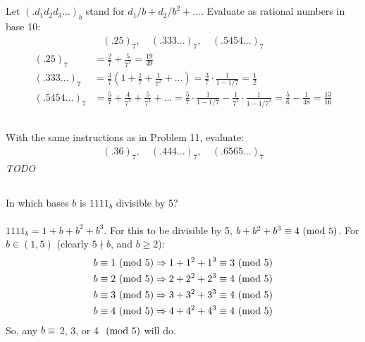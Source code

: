 \documentclass{article} \usepackage{amsmath}
\begin{document}
\subsection{}
Let $(.d_1d_2d_3...)_b$ stand for $d_1/b + d_2/b^2 + ...$.
Evaluate as rational numbers in base 10:
\begin{gather*}
    (.25)_7, \quad (.333...)_7, \quad (.5454...)_7
\end{gather*}
\begin{align*}
    (.25)_7 &= \frac{2}{7} + \frac{5}{7^2} = \frac{19}{49}\\
    (.333...)_7 &= \frac{3}{7}\left(1 + \frac{1}{7} + \frac{1}{7^2} + ...\right)
    = \frac{3}{7}\cdot\frac{1}{1 - 1/7} = \frac{1}{2}\\
    (.5454...)_7 &= \frac{5}{7} + \frac{4}{7^2} + \frac{5}{7^3} + ...
    = \frac{5}{7}\cdot\frac{1}{1 - 1/7} - \frac{1}{7^2}\cdot\frac{1}{1 - 1/7^2} =
    \frac{5}{6} - \frac{1}{48} = \frac{13}{16}
\end{align*}

\subsection{}
With the same instructions as in Problem 11, evaluate:
\begin{gather*}
    (.36)_7, \quad (.444...)_7, \quad (.6565...)_7
\end{gather*}
\textit{TODO}

\subsection{}
In which bases $b$ is $1111_b$ divisible by 5?\\~\\
$1111_b = 1 + b + b^2 + b^3$.
For this to be divisible by 5, $b + b^2 + b^3 \equiv 4 \ (\mathrm{mod}\ 5)$.
For $b \in (1, 5)$ (clearly $5 \nmid b$, and $b \geq 2$):
\begin{align*}
    b \equiv 1 \ (\mathrm{mod}\ 5) &\Rightarrow 1 + 1^2 + 1^3 \equiv 3 \ (\mathrm{mod}\ 5)\\
    b \equiv 2 \ (\mathrm{mod}\ 5) &\Rightarrow 2 + 2^2 + 2^3 \equiv 4 \ (\mathrm{mod}\ 5)\\
    b \equiv 3 \ (\mathrm{mod}\ 5) &\Rightarrow 3 + 3^2 + 3^3 \equiv 4 \ (\mathrm{mod}\ 5)\\
    b \equiv 4 \ (\mathrm{mod}\ 5) &\Rightarrow 4 + 4^2 + 4^3 \equiv 4 \ (\mathrm{mod}\ 5)
\end{align*}
So, any $b \equiv$ 2, 3, or 4 $\ (\mathrm{mod}\ 5)$ will do.

\end{document}
